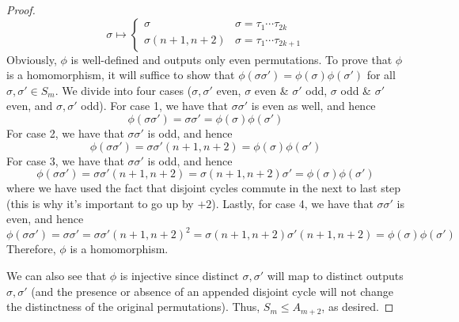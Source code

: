 \documentclass[../psets.tex]{subfiles}
\begin{document}
\begin{enumerate}
\begin{enumerate}
\begin{proof}
\begin{equation*}
                \sigma \mapsto
                \begin{cases}
                    \sigma & \sigma=\tau_1\cdots\tau_{2k}\\
                    \sigma(n+1,n+2) & \sigma=\tau_1\cdots\tau_{2k+1}
                \end{cases}
            \end{equation*}
            Obviously, $\phi$ is well-defined and outputs only even permutations. To prove that $\phi$ is a homomorphism, it will suffice to show that $\phi(\sigma\sigma')=\phi(\sigma)\phi(\sigma')$ for all $\sigma,\sigma'\in S_m$. We divide into four cases ($\sigma,\sigma'$ even, $\sigma$ even \& $\sigma'$ odd, $\sigma$ odd \& $\sigma'$ even, and $\sigma,\sigma'$ odd). For case 1, we have that $\sigma\sigma'$ is even as well, and hence
            \begin{equation*}
                \phi(\sigma\sigma') = \sigma\sigma'
                = \phi(\sigma)\phi(\sigma')
            \end{equation*}
            For case 2, we have that $\sigma\sigma'$ is odd, and hence
            \begin{equation*}
                \phi(\sigma\sigma') = \sigma\sigma'(n+1,n+2)
                = \phi(\sigma)\phi(\sigma')
            \end{equation*}
            For case 3, we have that $\sigma\sigma'$ is odd, and hence
            \begin{equation*}
                \phi(\sigma\sigma') = \sigma\sigma'(n+1,n+2)
                = \sigma(n+1,n+2)\sigma'
                = \phi(\sigma)\phi(\sigma')
            \end{equation*}
            where we have used the fact that disjoint cycles commute in the next to last step (this is why it's important to go up by $+2$). Lastly, for case 4, we have that $\sigma\sigma'$ is even, and hence
            \begin{equation*}
                \phi(\sigma\sigma') = \sigma\sigma'
                = \sigma\sigma'(n+1,n+2)^2
                = \sigma(n+1,n+2)\sigma'(n+1,n+2)
                = \phi(\sigma)\phi(\sigma')
            \end{equation*}
            Therefore, $\phi$ is a homomorphism.\par
            We can also see that $\phi$ is injective since distinct $\sigma,\sigma'$ will map to distinct outputs $\sigma,\sigma'$ (and the presence or absence of an appended disjoint cycle will not change the distinctness of the original permutations). Thus, $S_m\leq A_{m+2}$, as desired.\par

\end{proof}
\end{enumerate}
\end{enumerate}
\end{document}
